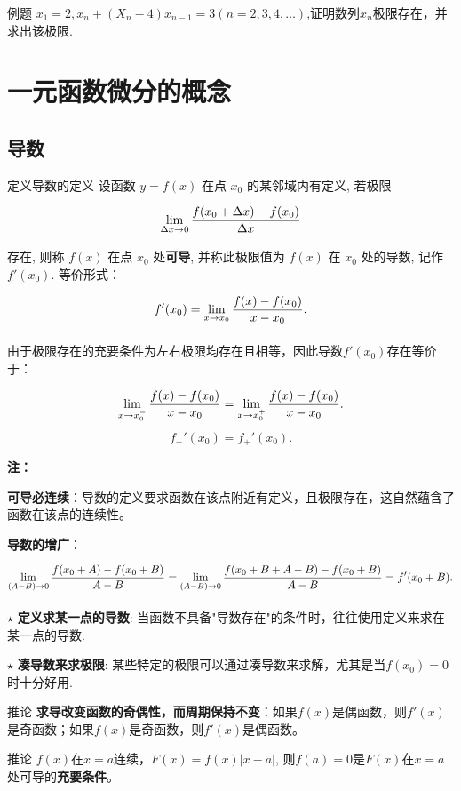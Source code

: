 \documentclass[a4paper,12pt,oneside,fontset=none]{ctexbook}
\let\olddfrac\dfrac
\renewcommand{\dfrac}[2]{
    \olddfrac{#1\vrule width 0pt height 1.15em depth 0em}{#2\vrule width 0pt height 0em depth 0.6em}
}
\let\oldlim\lim
\renewcommand{\lim}{\displaystyle\oldlim}
\newenvironment{corollary}[1][]{\begin{thmBox}{推论}{#1}}{\end{thmBox}}
\newcounter{definition}[chapter]
\newenvironment{definition}[1][]{\begin{defBox}{定义}{#1}}{\end{defBox}}
\newcounter{example}[chapter]
\newenvironment{example}[1][]{\begin{exBox}{例题}{#1}}{\end{exBox}}
\newenvironment{note}{
    \par\vspace{0.5em}\noindent
    \textbf{\color{NoteColor} 注：}
}{
    \par\vspace{0.5em}
}
\numberwithin{equation}{chapter}
\begin{document}
\begin{example}
$x_1 = 2, x_n+(X_n - 4)x_{n-1}=3(n=2,3,4,\ldots)$,证明数列${x_n}$极限存在，并求出该极限.
\end{example}

\chapter{一元函数微分的概念}

\section{导数}
\begin{definition}[导数的定义]
设函数 $y = f(x)$ 在点 $x_0$ 的某邻域内有定义, 若极限
\[
    \lim_{\Delta x \to 0} \dfrac{f(x_0 + \Delta x) - f(x_0)}{\Delta x}
\]
存在, 则称 $f(x)$ 在点 $x_0$ 处\textbf{可导}, 并称此极限值为 $f(x)$ 在 $x_0$ 处的导数, 记作 $f'(x_0)$.
等价形式：
\[
    f'(x_0) = \lim_{x \to x_0} \dfrac{f(x) - f(x_0)}{x - x_0}.
\]

由于极限存在的充要条件为左右极限均存在且相等，因此导数$f'(x_0)$存在等价于：
\[
    \lim_{x \to x_0^-} \dfrac{f(x) - f(x_0)}{x - x_0} = \lim_{x \to x_0^+} \dfrac{f(x) - f(x_0)}{x - x_0}.
\]
\[
    f_-'(x_0) = f_+'(x_0).
\]
\end{definition} 

\begin{note}
\textbf{可导必连续}：导数的定义要求函数在该点附近有定义，且极限存在，这自然蕴含了函数在该点的连续性。

\textbf{导数的增广}：
\[
    \lim_{(A-B) \to 0} \dfrac{f(x_0 + A) - f(x_0 + B)}{A - B} = \lim_{(A-B) \to 0} \dfrac{f(x_0+B+A-B)-f(x_0+B)}{A-B}=f'(x_0+B).
\]

$\star$ \textbf{定义求某一点的导数}: 当函数不具备"导数存在"的条件时，往往使用定义来求在某一点的导数.

$\star$ \textbf{凑导数来求极限}: 某些特定的极限可以通过凑导数来求解，尤其是当$f(x_0)=0$时十分好用.
\end{note}

\begin{corollary}
\textbf{求导改变函数的奇偶性，而周期保持不变}：如果$f(x)$是偶函数，则$f'(x)$是奇函数；如果$f(x)$是奇函数，则$f'(x)$是偶函数。
\end{corollary}

\begin{corollary}
$f(x)$在$x=a$连续，$F(x)=f(x)|x-a|$, 则$f(a)=0$是$F(x)$在$x=a$处可导的\textbf{充要条件}。
\end{corollary}
\end{document}
